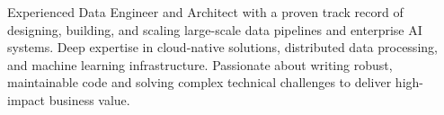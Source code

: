 

\begin{cvparagraph}

Experienced Data Engineer and Architect with a proven track record of designing, building, and scaling large-scale data pipelines and enterprise AI systems. Deep expertise in cloud-native solutions, distributed data processing, and machine learning infrastructure. Passionate about writing robust, maintainable code and solving complex technical challenges to deliver high-impact business value.
\end{cvparagraph}
